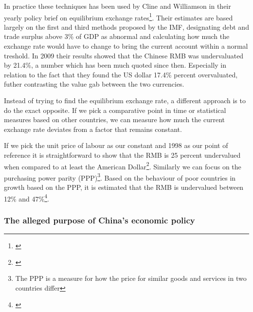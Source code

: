 \documentclass[11pt]{article}
\begin{document}
In practice these techniques has been used by Cline and Williamson in 
their yearly policy brief on equilibrium exchange 
rates\footnote{\cite{cline2009,cline2012}}.  Their estimates are based 
largely on the first and third methods proposed by the IMF, designating 
debt and trade surplus above 3\% of GDP as abnormal and calculating how 
much the exchange rate would have to change to bring the current account 
within a normal treshold. In 2009 their results showed that the Chinese 
RMB was undervaluated by 21.4\%, a number which has been much quoted 
since then. Especially in relation to the fact that they found the US 
dollar 17.4\% percent overvaluated, futher contrasting the value gab 
between the two currencies.

Instead of trying to find the equilibrium exchange rate, a different 
approach is to do the exact opposite. If we pick a comparative point in 
time or statistical measures based on other countries, we can measure 
how much the current exchange rate deviates from a factor that remains 
constant.

If we pick the unit price of labour as our constant and 1998 as our 
point of reference it is straightforward to show that the RMB is 25 
percent undervalued when compared to at least the American 
Dollar\footnote{\cite{chimerica2009}}. Similarly we can focus on the 
purchasing power parity (PPP)\footnote{The PPP is a measure for how the 
price for similar goods and services in two countries differ}. Based on 
the behaviour of poor countries in growth based on the PPP, it is 
estimated that the RMB is undervalued between 12\% and 
47\%\footnote{\cite{Subramanian2010}}.



\subsubsection{The alleged purpose of China's economic policy}
\end{document}
